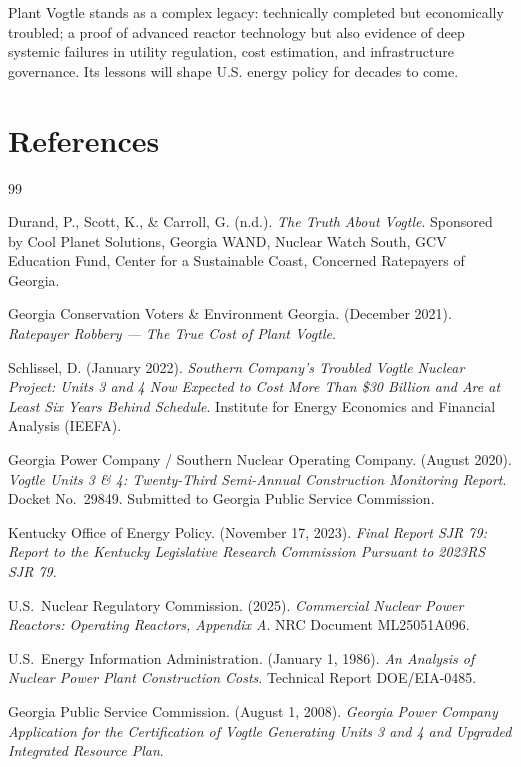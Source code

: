 \documentclass[12pt,a4paper]{article}
\begin{document}
Plant Vogtle stands as a complex legacy: technically completed but economically
troubled; a proof of advanced reactor technology but also evidence of deep systemic
failures in utility regulation, cost estimation, and infrastructure governance. Its
lessons will shape U.S. energy policy for decades to come.

\section*{References}

\begin{thebibliography}{99}

Durand, P., Scott, K., \& Carroll, G. (n.d.).
\textit{The Truth About Vogtle}.
Sponsored by Cool Planet Solutions, Georgia WAND, Nuclear Watch South,
GCV Education Fund, Center for a Sustainable Coast, Concerned Ratepayers
of Georgia.

Georgia Conservation Voters \& Environment Georgia. (December 2021).
\textit{Ratepayer Robbery --- The True Cost of Plant Vogtle}.

Schlissel, D. (January 2022).
\textit{Southern Company's Troubled Vogtle Nuclear Project: Units 3 and 4
Now Expected to Cost More Than \$30 Billion and Are at Least Six Years
Behind Schedule}.
Institute for Energy Economics and Financial Analysis (IEEFA).

Georgia Power Company / Southern Nuclear Operating Company. (August 2020).
\textit{Vogtle Units 3 \& 4: Twenty-Third Semi-Annual Construction Monitoring
Report}. Docket No.\ 29849. Submitted to Georgia Public Service Commission.

Kentucky Office of Energy Policy. (November 17, 2023).
\textit{Final Report SJR 79: Report to the Kentucky Legislative Research
Commission Pursuant to 2023RS SJR 79}.

U.S.\ Nuclear Regulatory Commission. (2025).
\textit{Commercial Nuclear Power Reactors: Operating Reactors, Appendix A}.
NRC Document ML25051A096.

U.S.\ Energy Information Administration. (January 1, 1986).
\textit{An Analysis of Nuclear Power Plant Construction Costs}.
Technical Report DOE/EIA-0485.

Georgia Public Service Commission. (August 1, 2008).
\textit{Georgia Power Company Application for the Certification of Vogtle
Generating Units 3 and 4 and Upgraded Integrated Resource Plan}.

\end{thebibliography}
\end{document}
